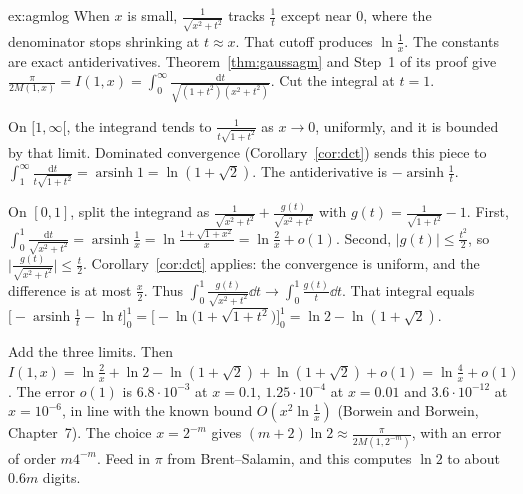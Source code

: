 \begin{solution}{ex:agmlog}
\idea When $x$ is small, $\frac1{\sqrt{x^2+t^2}}$ tracks $\frac1t$ except near $0$, where the denominator stops shrinking at $t\approx x$. That cutoff produces $\ln\frac1x$. The constants are
exact antiderivatives.
\writeup Theorem~\ref{thm:gaussagm} and Step~1 of its proof give $\frac\pi{2M(1,x)}=I(1,x)=\int_0^\infty\frac{\mathrm dt}{\sqrt{(1+t^2)(x^2+t^2)}}$. Cut the integral at $t=1$.

On $[1,\infty[$, the integrand tends to $\frac1{t\sqrt{1+t^2}}$ as $x\to0$, uniformly, and it is bounded by that limit. Dominated convergence (Corollary~\ref{cor:dct}) sends this piece to
$\int_1^\infty\frac{\mathrm dt}{t\sqrt{1+t^2}}=\operatorname{arsinh}1=\ln(1+\sqrt2)$. The antiderivative is $-\operatorname{arsinh}\frac1t$.

On $[0,1]$, split the integrand as $\frac1{\sqrt{x^2+t^2}}+\frac{g(t)}{\sqrt{x^2+t^2}}$ with $g(t)=\frac1{\sqrt{1+t^2}}-1$. First, $\int_0^1\frac{\mathrm dt}{\sqrt{x^2+t^2}}=\operatorname{arsinh}\frac1x
=\ln\frac{1+\sqrt{1+x^2}}x=\ln\frac2x+o(1)$. Second, $|g(t)|\le\frac{t^2}2$, so $\bigl|\frac{g(t)}{\sqrt{x^2+t^2}}\bigr|\le\frac t2$. Corollary~\ref{cor:dct} applies: the convergence is uniform, and the difference is at most $\frac x2$. Thus
$\int_0^1\frac{g(t)}{\sqrt{x^2+t^2}}\dd t\to\int_0^1\frac{g(t)}t\dd t$. That integral equals $\bigl[-\operatorname{arsinh}\frac1t-\ln t\bigr]_0^1=\bigl[-\ln\bigl(1+\sqrt{1+t^2}\bigr)\bigr]_0^1=\ln2-\ln(1+\sqrt2)$.

Add the three limits. Then $I(1,x)=\ln\frac2x+\ln2-\ln(1+\sqrt2)+\ln(1+\sqrt2)+o(1)=\ln\frac4x+o(1)$. The error $o(1)$ is $6.8\cdot10^{-3}$ at $x=0.1$, $1.25\cdot10^{-4}$
at $x=0.01$ and $3.6\cdot10^{-12}$ at $x=10^{-6}$, in line with the known bound $O(x^2\ln\frac1x)$ (Borwein and Borwein, Chapter~7). The choice $x=2^{-m}$ gives $(m+2)\ln2\approx\frac\pi{2M(1,2^{-m})}$, with an error of order $m4^{-m}$. Feed in $\pi$ from Brent--Salamin, and this computes $\ln2$ to about $0.6m$ digits.
\end{solution}

